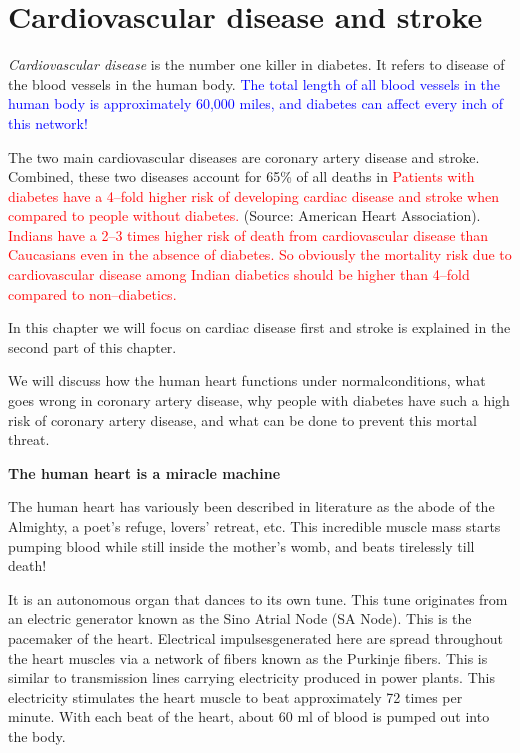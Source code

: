 \chapter{Cardiovascular disease and stroke}\label{chap12}

\textit{Cardiovascular disease} is the number one killer in diabetes. It refers to disease of the blood vessels in the human body. \textcolor{blue}{The total length of all blood vessels in the human body is approximately 60,000 miles, and diabetes can affect every inch of this network!}

The two main cardiovascular diseases are coronary artery disease and stroke. Combined, these two diseases account for 65\% of all deaths in \textcolor{red}{Patients with diabetes have a 4–fold higher risk of developing cardiac disease and stroke when compared to people without diabetes.} (Source: American Heart Association). \textcolor{red}{Indians have a 2–3 times higher risk of death from cardiovascular disease than Caucasians even in the absence of diabetes. So obviously the mortality risk due to cardiovascular disease among Indian diabetics should be higher than 4–fold compared to non–diabetics.}

In this chapter we will focus on cardiac disease first and stroke is explained in the second part of this chapter.

We will discuss how the human heart functions under normal\break conditions, what goes wrong in coronary artery disease, why people with diabetes have such a high risk of coronary artery disease, and what can be done to prevent this mortal threat.

\noindent\textbf{The human heart is a miracle machine}

The human heart has variously been described in literature as the abode of the Almighty, a poet’s refuge, lovers’ retreat, etc. This incre\-dible muscle mass starts pumping blood while still inside the mother’s womb, and beats tirelessly till death!

It is an autonomous organ that dances to its own tune. This tune originates from an electric generator known as the Sino Atrial Node (SA Node). This is the pacemaker of the heart. Electrical impulses\break generated here are spread throughout the heart muscles via a network of fibers known as the Purkinje fibers. This is similar to trans\-mission lines carrying electricity produced in power plants. This electri\-city stimulates the heart muscle to beat approximately 72 times per minute. With each beat of the heart, about 60 ml of blood is pumped out into the body.

